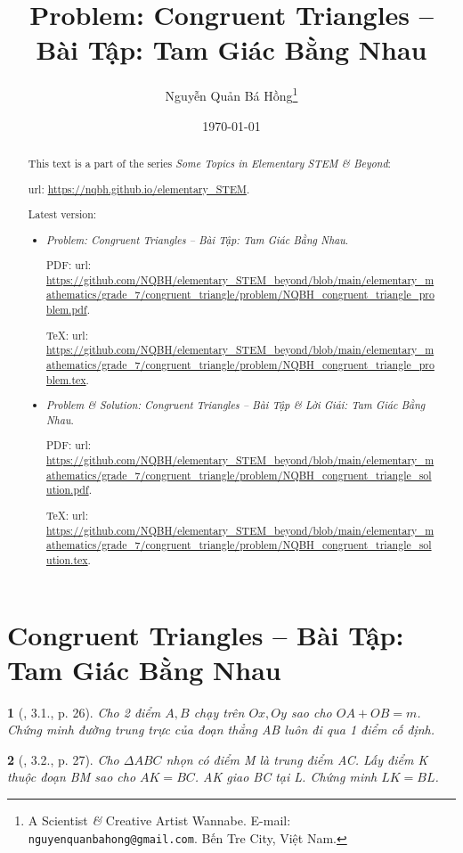 \documentclass{article}
\title{Problem: Congruent Triangles -- Bài Tập: Tam Giác Bằng Nhau}
\author{Nguyễn Quản Bá Hồng\footnote{A Scientist {\it\&} Creative Artist Wannabe. E-mail: {\tt nguyenquanbahong@gmail.com}. Bến Tre City, Việt Nam.}}
\date{\today}
\newtheorem{baitoan}{}
\begin{document}
\maketitle
\begin{abstract}
	This text is a part of the series {\it Some Topics in Elementary STEM \& Beyond}:
	
	{\sc url}: \url{https://nqbh.github.io/elementary_STEM}.
	
	Latest version:
	\begin{itemize}
		\item {\it Problem: Congruent Triangles -- Bài Tập: Tam Giác Bằng Nhau}.
		
		PDF: {\sc url}: \url{https://github.com/NQBH/elementary_STEM_beyond/blob/main/elementary_mathematics/grade_7/congruent_triangle/problem/NQBH_congruent_triangle_problem.pdf}.
		
		\TeX: {\sc url}: \url{https://github.com/NQBH/elementary_STEM_beyond/blob/main/elementary_mathematics/grade_7/congruent_triangle/problem/NQBH_congruent_triangle_problem.tex}.
		\item {\it Problem \& Solution: Congruent Triangles -- Bài Tập \& Lời Giải: Tam Giác Bằng Nhau}.
		
		PDF: {\sc url}: \url{https://github.com/NQBH/elementary_STEM_beyond/blob/main/elementary_mathematics/grade_7/congruent_triangle/problem/NQBH_congruent_triangle_solution.pdf}.
		
		\TeX: {\sc url}: \url{https://github.com/NQBH/elementary_STEM_beyond/blob/main/elementary_mathematics/grade_7/congruent_triangle/problem/NQBH_congruent_triangle_solution.tex}.
	\end{itemize}
\end{abstract}
\tableofcontents


\section{Congruent Triangles -- Bài Tập: Tam Giác Bằng Nhau}

\begin{baitoan}[\cite{Hung_Mai_Toan_7_hinh_hoc}, 3.1., p. 26]
	Cho 2 điểm $A,B$ chạy trên $Ox,Oy$ sao cho $OA + OB = m$. Chứng minh đường trung trực của đoạn thẳng AB luôn đi qua 1 điểm cố định.
\end{baitoan}

\begin{baitoan}[\cite{Hung_Mai_Toan_7_hinh_hoc}, 3.2., p. 27]
	Cho $\Delta ABC$ nhọn có điểm M là trung điểm AC. Lấy điểm K thuộc đoạn BM sao cho $AK = BC$. AK giao BC tại L. Chứng minh $LK = BL$.
\end{baitoan}
\end{document}
